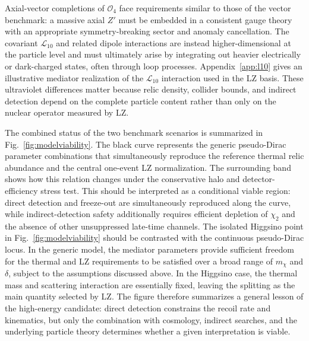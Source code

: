 \documentclass[aps,prd,reprint,superscriptaddress,nofootinbib,longbibliography,floatfix]{revtex4-2}
\begin{document}
Axial-vector completions of $\mathcal{O}_4$ face requirements similar to those of the vector benchmark: a massive axial $Z'$ must be embedded in a consistent gauge theory with an appropriate symmetry-breaking sector and anomaly cancellation. The covariant $\mathcal{L}_{10}$ and related dipole interactions are instead higher-dimensional at the particle level and must ultimately arise by integrating out heavier electrically or dark-charged states, often through loop processes. Appendix~\ref{app:l10} gives an illustrative mediator realization of the $\mathcal{L}_{10}$ interaction used in the LZ basis. These ultraviolet differences matter because relic density, collider bounds, and indirect detection depend on the complete particle content rather than only on the nuclear operator measured by LZ.

The combined status of the two benchmark scenarios is summarized in Fig.~\ref{fig:modelviability}. The black curve represents the generic pseudo-Dirac parameter combinations that simultaneously reproduce the reference thermal relic abundance and the central one-event LZ normalization. The surrounding band shows how this relation changes under the conservative halo and detector-efficiency stress test. This should be interpreted as a conditional viable region: direct detection and freeze-out are simultaneously reproduced along the curve, while indirect-detection safety additionally requires efficient depletion of $\chi_2$ and the absence of other unsuppressed late-time channels.
The isolated Higgsino point in Fig.~\ref{fig:modelviability} should be contrasted with the continuous pseudo-Dirac locus. In the generic model, the mediator parameters provide sufficient freedom for the thermal and LZ requirements to be satisfied over a broad range of $m_\chi$ and $\delta$, subject to the assumptions discussed above. In the Higgsino case, the thermal mass and scattering interaction are essentially fixed, leaving the splitting as the main quantity selected by LZ. The figure therefore summarizes a general lesson of the high-energy candidate: direct detection constrains the recoil rate and kinematics, but only the combination with cosmology, indirect searches, and the underlying particle theory determines whether a given interpretation is viable.
\end{document}
